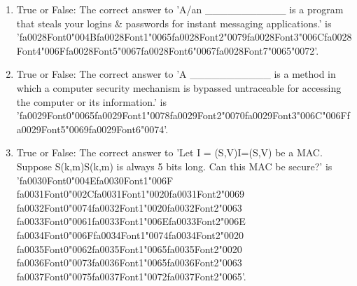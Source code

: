 \documentclass[12pt]{article}
\begin{document}
\begin{enumerate}[label=\arabic*.]
\item True or False: The correct answer to 'A/an \_\_\_\_\_\_\_\_\_\_\_ is a program that steals your logins \& passwords for instant messaging applications.' is '{\csname fa0028Font0\endcsname\char"004B}{\csname fa0028Font1\endcsname\char"0065}{\csname fa0028Font2\endcsname\char"0079}{\csname fa0028Font3\endcsname\char"006C}{\csname fa0028Font4\endcsname\char"006F}{\csname fa0028Font5\endcsname\char"0067}{\csname fa0028Font6\endcsname\char"0067}{\csname fa0028Font7\endcsname\char"0065}{\char"0072}'.
\item True or False: The correct answer to 'A \_\_\_\_\_\_\_\_\_\_\_ is a method in which a computer security mechanism is bypassed untraceable for accessing the computer or its information.' is '{\csname fa0029Font0\endcsname\char"0065}{\csname fa0029Font1\endcsname\char"0078}{\csname fa0029Font2\endcsname\char"0070}{\csname fa0029Font3\endcsname\char"006C}{\char"006F}{\csname fa0029Font5\endcsname\char"0069}{\csname fa0029Font6\endcsname\char"0074}'.
\item True or False: The correct answer to 'Let I = (S,V)I=(S,V) be a MAC. Suppose S(k,m)S(k,m) is always 5 bits long. Can this MAC be secure?' is '{\csname fa0030Font0\endcsname\char"004E}{\csname fa0030Font1\endcsname\char"006F} {\csname fa0031Font0\endcsname\char"002C}{\csname fa0031Font1\endcsname\char"0020}{\csname fa0031Font2\endcsname\char"0069} {\csname fa0032Font0\endcsname\char"0074}{\csname fa0032Font1\endcsname\char"0020}{\csname fa0032Font2\endcsname\char"0063} {\csname fa0033Font0\endcsname\char"0061}{\csname fa0033Font1\endcsname\char"006E}{\csname fa0033Font2\endcsname\char"006E} {\csname fa0034Font0\endcsname\char"006F}{\csname fa0034Font1\endcsname\char"0074}{\csname fa0034Font2\endcsname\char"0020} {\csname fa0035Font0\endcsname\char"0062}{\csname fa0035Font1\endcsname\char"0065}{\csname fa0035Font2\endcsname\char"0020} {\csname fa0036Font0\endcsname\char"0073}{\csname fa0036Font1\endcsname\char"0065}{\csname fa0036Font2\endcsname\char"0063} {\csname fa0037Font0\endcsname\char"0075}{\csname fa0037Font1\endcsname\char"0072}{\csname fa0037Font2\endcsname\char"0065}'.
\end{enumerate}
\end{document}
